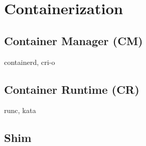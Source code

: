 \section{Containerization}

\subsection{Container Manager (CM)}

containerd, cri-o

\subsection{Container Runtime (CR)}

runc, kata

\subsection{Shim}

